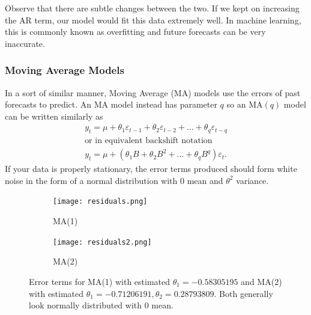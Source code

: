 \documentclass{article}
\begin{document}
    Observe that there are subtle changes between the two. If we kept on increasing the AR term, our model would fit this data extremely well. In machine learning, this is commonly known as overfitting and future forecasts can be very inaccurate.

  \subsubsection{Moving Average Models}
    In a sort of similar manner, Moving Average (MA) models use the errors of past forecasts to predict. An MA model instead has parameter $q$ so an MA$(q)$ model can be written similarly as
    \begin{gather*}
      y_t = \mu + \theta_1 \varepsilon_{t-1} + \theta_2 \varepsilon_{t-2} + ... + \theta_q \varepsilon_{t-q}\\
      \text{or in equivalent backshift notation}\\
      y_t = \mu + (\theta_1B + \theta_2B^2 + ... + \theta_qB^q)\varepsilon_t.
    \end{gather*}
    If your data is properly stationary, the error terms produced should form white noise in the form of a normal distribution with $0$ mean and $\theta^2$ variance.

    \begin{figure}[H]
      \centering
      \captionsetup{justification=centering}
      \begin{subfigure}[b]{0.49\linewidth}
        \texttt{[image: residuals.png]}
        \caption{MA(1)}
      \end{subfigure}
      \begin{subfigure}[b]{0.49\linewidth}
        \texttt{[image: residuals2.png]}
        \caption{MA(2)}
      \end{subfigure}
      \caption{Error terms for MA(1) with estimated $\theta_1 = -0.58305195$ and MA(2) with estimated $\theta_1 = -0.71206191, \theta_2 =  0.28793809$. Both generally look normally distributed with 0 mean.}
    \end{figure}
\end{document}
